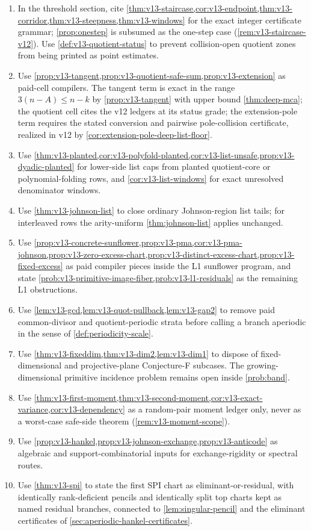 \begin{enumerate}[label=\textup{(\arabic*)},leftmargin=2.2em]
\item In the threshold section, cite \cref{thm:v13-staircase,cor:v13-endpoint,thm:v13-corridor,thm:v13-steepness,thm:v13-windows} for the exact integer certificate grammar; \cref{prop:onestep} is subsumed as the one-step case \textup(\cref{rem:v13-staircase-v12}\textup).  Use \cref{def:v13-quotient-status} to prevent collision-open quotient zones from being printed as point estimates.
\item Use \cref{prop:v13-tangent,prop:v13-quotient-safe-sum,prop:v13-extension} as paid-cell compilers.  The tangent term is exact in the range $3(n-A)\le n-k$ by \cref{prop:v13-tangent} with upper bound \cref{thm:deep-mca}; the quotient cell cites the v12 ledgers at its status grade; the extension-pole term requires the stated conversion and pairwise pole-collision certificate, realized in v12 by \cref{cor:extension-pole-deep-list-floor}.
\item Use \cref{thm:v13-planted,cor:v13-polyfold-planted,cor:v13-list-unsafe,prop:v13-dyadic-planted} for lower-side list caps from planted quotient-core or polynomial-folding rows, and \cref{cor:v13-list-windows} for exact unresolved denominator windows.
\item Use \cref{thm:v13-johnson-list} to close ordinary Johnson-region list tails; for interleaved rows the arity-uniform \cref{thm:johnson-list} applies unchanged.
\item Use \cref{prop:v13-concrete-sunflower,prop:v13-pma,cor:v13-pma-johnson,prop:v13-zero-excess-chart,prop:v13-distinct-excess-chart,prop:v13-fixed-excess} as paid compiler pieces inside the L1 sunflower program, and state \cref{prob:v13-primitive-image-fiber,prob:v13-l1-residuals} as the remaining L1 obstructions.
\item Use \cref{lem:v13-gcd,lem:v13-quot-pullback,lem:v13-gap2} to remove paid common-divisor and quotient-periodic strata before calling a branch aperiodic in the sense of \cref{def:periodicity-scale}.
\item Use \cref{thm:v13-fixeddim,thm:v13-dim2,lem:v13-dim1} to dispose of fixed-dimensional and projective-plane Conjecture-F subcases.  The growing-dimensional primitive incidence problem remains open inside \cref{prob:band}.
\item Use \cref{thm:v13-first-moment,thm:v13-second-moment,cor:v13-exact-variance,cor:v13-dependency} as a random-pair moment ledger only, never as a worst-case safe-side theorem \textup(\cref{rem:v13-moment-scope}\textup).
\item Use \cref{prop:v13-hankel,prop:v13-johnson-exchange,prop:v13-anticode} as algebraic and support-combinatorial inputs for exchange-rigidity or spectral routes.
\item Use \cref{thm:v13-spi} to state the first SPI chart as eliminant-or-residual, with identically rank-deficient pencils and identically split top charts kept as named residual branches, connected to \cref{lem:singular-pencil} and the eliminant certificates of \cref{sec:aperiodic-hankel-certificates}.
\end{enumerate}

